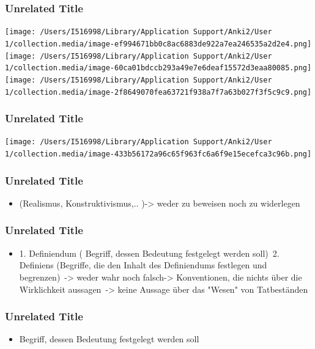 \documentclass{beamer}
\begin{document}
\begin{frame}
\frametitle{Unrelated Title}

\begin{center}
\texttt{[image: /Users/I516998/Library/Application Support/Anki2/User 1/collection.media/image-ef994671bb0c8ac6883de922a7ea246535a2d2e4.png]}
\texttt{[image: /Users/I516998/Library/Application Support/Anki2/User 1/collection.media/image-60ca01bdccb293a49e7e6deaf15572d3eaa80085.png]}
\texttt{[image: /Users/I516998/Library/Application Support/Anki2/User 1/collection.media/image-2f8649070fea63721f938a7f7a63b027f3f5c9c9.png]}
\end{center}


\note[item]{}
\end{frame}
\begin{frame}
\frametitle{Unrelated Title}

\begin{center}
\texttt{[image: /Users/I516998/Library/Application Support/Anki2/User 1/collection.media/image-433b56172a96c65f963fc6a6f9e15ecefca3c96b.png]}
\end{center}


\note[item]{}
\end{frame}
\begin{frame}
\frametitle{Unrelated Title}


\begin{itemize}
\item (Realismus, Konstruktivismus,.. )-> weder zu beweisen noch zu widerlegen 
\end{itemize}

\note[item]{}
\end{frame}
\begin{frame}
\frametitle{Unrelated Title}


\begin{itemize}
\item 1. Definiendum ( Begriff, dessen Bedeutung festgelegt werden soll) 2. Definiens (Begriffe, die den Inhalt des Definiendums festlegen und begrenzen) -> weder wahr noch falsch-> Konventionen, die nichts über die Wirklichkeit aussagen -> keine Aussage über das "Wesen" von Tatbeständen 
\end{itemize}

\note[item]{}
\end{frame}
\begin{frame}
\frametitle{Unrelated Title}


\begin{itemize}
\item Begriff, dessen Bedeutung festgelegt werden soll
\end{itemize}

\note[item]{}
\end{frame}
\end{document}
